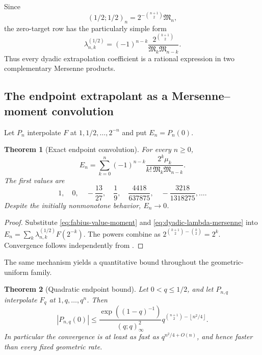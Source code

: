 \documentclass[11pt,a4paper,oneside]{article}
\newtheorem{theorem}{Theorem}[section]
\theoremstyle{definition}
\theoremstyle{remark}
\newcommand{\floor}[1]{\left\lfloor#1\right\rfloor}
\begin{document}
Since
\begin{equation}
 (1/2;1/2)_n=2^{-\binom{n+1}{2}}\mathfrak M_n,
 \label{eq:qpoch-mersenne}
\end{equation}
the zero-target row has the particularly simple form
\begin{equation}
 \lambda_{n,k}^{(1/2)}
 =(-1)^{n-k}
 \frac{2^{\binom{k+1}{2}}}
 {\mathfrak M_k\mathfrak M_{n-k}}.
 \label{eq:dyadic-lambda-mersenne}
\end{equation}
Thus every dyadic extrapolation coefficient is a rational expression in two
complementary Mersenne products.

\subsection{The endpoint extrapolant as a Mersenne--moment convolution}

Let $P_n$ interpolate $F$ at
$1,1/2,\ldots,2^{-n}$ and put $E_n=P_n(0)$.

\begin{theorem}[Exact endpoint convolution]
\label{thm:fabius-endpoint-convolution}
For every $n\ge0$,
\begin{equation}
 E_n
 =\sum_{k=0}^n(-1)^{n-k}
 \frac{2^k\mu_k}
 {k!\,\mathfrak M_k\mathfrak M_{n-k}}.
 \label{eq:fabius-endpoint-convolution}
\end{equation}
The first values are
\[
 1,\quad 0,\quad -\frac{13}{27},\quad \frac19,\quad
 \frac{4418}{637875},\quad -\frac{3218}{1318275},\ldots.
\]
Despite the initially nonmonotone behavior, $E_n\to0$.
\end{theorem}

\begin{proof}
Substitute \eqref{eq:fabius-value-moment} and
\eqref{eq:dyadic-lambda-mersenne} into
$E_n=\sum_k\lambda_{n,k}^{(1/2)}F(2^{-k})$.  The powers combine as
$2^{\binom{k+1}{2}-\binom k2}=2^k$.  Convergence follows independently from
.
\end{proof}

The same mechanism yields a quantitative bound throughout the
geometric-uniform family.

\begin{theorem}[Quadratic endpoint bound]
\label{thm:quadratic-endpoint-bound}
Let $0<q\le1/2$, and let $P_{n,q}$ interpolate $F_q$ at
$1,q,\ldots,q^n$.  Then
\begin{equation}
 |P_{n,q}(0)|
 \le
 \frac{\exp((1-q)^{-1})}{(q;q)_\infty^2}
 q^{\binom{n+1}{2}-\floor{n^2/4}}.
 \label{eq:quadratic-endpoint-bound}
\end{equation}
In particular the convergence is at least as fast as
$q^{n^2/4+O(n)}$, and hence faster than every fixed geometric rate.
\end{theorem}
\end{document}
